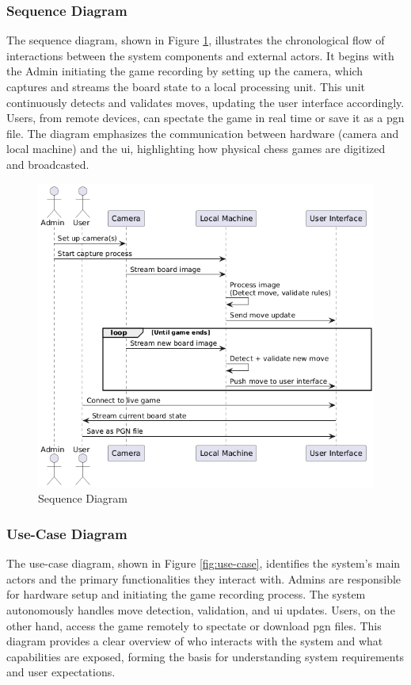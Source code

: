 \subsubsection*{Sequence Diagram}
\label{subsubsec:sequence-diagram}

The sequence diagram, shown in Figure \ref{fig:sequence}, illustrates the chronological flow of interactions between the system components and external actors. It begins with the Admin initiating the game recording by setting up the camera, which captures and streams the board state to a local processing unit. This unit continuously detects and validates moves, updating the user interface accordingly. Users, from remote devices, can spectate the game in real time or save it as a \gls{pgn} file. The diagram emphasizes the communication between hardware (camera and local machine) and the \gls{ui}, highlighting how physical chess games are digitized and broadcasted.

\newpage

\begin{figure}[h!]
    \centering
    \includegraphics[width=0.75\linewidth]{figures/methods/uml/sequence.png}
    \caption[Sequence Diagram]{Sequence Diagram}
    \label{fig:sequence}
\end{figure}

\subsubsection*{Use-Case Diagram}
\label{subsubsec:use-case-diagram}

The use-case diagram, shown in Figure \ref{fig:use-case}, identifies the system’s main actors and the primary functionalities they interact with. Admins are responsible for hardware setup and initiating the game recording process. The system autonomously handles move detection, validation, and \gls{ui} updates. Users, on the other hand, access the game remotely to spectate or download \gls{pgn} files. This diagram provides a clear overview of who interacts with the system and what capabilities are exposed, forming the basis for understanding system requirements and user expectations.

